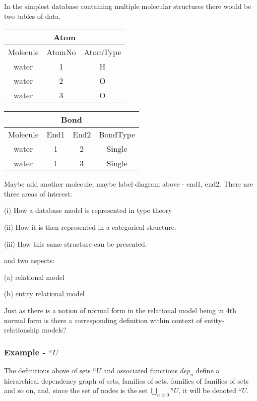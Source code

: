 \noindent In the simplest database containing multiple molecular structures there would be two tables of data.
\begin{table}[ht]
\begin{minipage}[b]{0.5\linewidth}\centering
\begin{tabular}{|c|c|c|}
\hline
\multicolumn{3}{|c|}{Atom} \\ \hline
Molecule&AtomNo&AtomType\\
\hline
water&1&H\\
water&2&O\\
water&3&O\\
\hline
\end{tabular}
\end{minipage}
\hspace{0.5cm}
\begin{minipage}[b]{0.5\linewidth}
\centering
\begin{tabular}{|c|c|c|c|}
\hline
\multicolumn{4}{|c|}{Bond} \\ \hline
Molecule&End1&End2&BondType \\
\hline
water&1&2&Single\\
water&1&3&Single\\
\hline
\end{tabular}
\end{minipage}
\end{table}
Maybe add another molecule, maybe label diagram above - end1, end2.
\noindent There are three areas of interest:

(i) How a database model is represented in type theory

(ii) How it is then represented in a categorical structure.

(iii) How this same structure can be presented.


\noindent and two aspects:

(a) relational model

(b) entity relational model

\noindent Just as there is a notion of normal form in the relational model being in 4th normal form is there a corresponding definition within context of entity-relationship models?


\subsubsection {Example - $^{\omega}U$}
The definitions above of sets $^nU$ and associated functions $dep_n$ define a hierarchical dependency graph of sets, families of sets, families of families of sets and so on, and, since the set of nodes is the set $\bigcup_{n \ge 0}{^nU}$, it will be denoted $^\omega U$.

